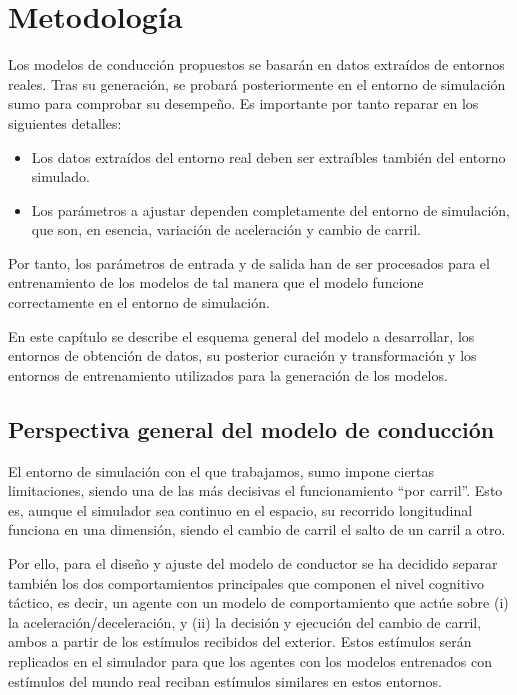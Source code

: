 \chapter{Metodología}
\label{ch:methodology}

Los modelos de conducción propuestos se basarán en datos extraídos de entornos reales. Tras su generación, se probará posteriormente en el entorno de simulación \ac{sumo} para comprobar su desempeño. Es importante por tanto reparar en los siguientes detalles:

\begin{itemize}
	\item Los datos extraídos del entorno real deben ser extraíbles también del entorno simulado. 
	\item Los parámetros a ajustar dependen completamente del entorno de simulación, que son, en esencia, variación de aceleración y cambio de carril.
\end{itemize}

Por tanto, los parámetros de entrada y de salida han de ser procesados para el entrenamiento de los modelos de tal manera que el modelo funcione correctamente en el entorno de simulación.

En este capítulo se describe el esquema general del modelo a desarrollar, los entornos de obtención de datos, su posterior curación y transformación y los entornos de entrenamiento utilizados para la generación de los modelos.

\section{Perspectiva general del modelo de conducción}

El entorno de simulación con el que trabajamos, \ac{sumo} impone ciertas limitaciones, siendo una de las más decisivas el funcionamiento \enquote{por carril}. Esto es, aunque el simulador sea continuo en el espacio, su recorrido longitudinal funciona en una dimensión, siendo el cambio de carril el salto de un carril a otro.

Por ello, para el diseño y ajuste del modelo de conductor se ha decidido separar también los dos comportamientos principales que componen el nivel cognitivo táctico, es decir, un agente con un modelo de comportamiento que actúe sobre (i) la aceleración/deceleración, y (ii) la decisión y ejecución del cambio de carril, ambos a partir de los estímulos recibidos del exterior. Estos estímulos serán replicados en el simulador para que los agentes con los modelos entrenados con estímulos del mundo real reciban estímulos similares en estos entornos.

